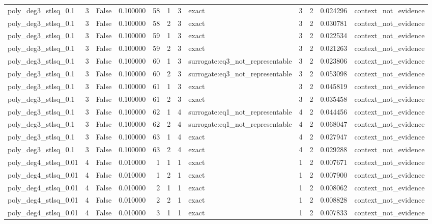 \begin{tabular}{lrrrrrrlrrrl}
poly\_deg3\_stlsq\_0.1 & 3 & False & 0.100000 & 58 & 1 & 3 & exact & 3 & 2 & 0.024296 & context\_not\_evidence \\
poly\_deg3\_stlsq\_0.1 & 3 & False & 0.100000 & 58 & 2 & 3 & exact & 3 & 2 & 0.030781 & context\_not\_evidence \\
poly\_deg3\_stlsq\_0.1 & 3 & False & 0.100000 & 59 & 1 & 3 & exact & 3 & 2 & 0.022534 & context\_not\_evidence \\
poly\_deg3\_stlsq\_0.1 & 3 & False & 0.100000 & 59 & 2 & 3 & exact & 3 & 2 & 0.021263 & context\_not\_evidence \\
poly\_deg3\_stlsq\_0.1 & 3 & False & 0.100000 & 60 & 1 & 3 & surrogate:eq3\_not\_representable & 3 & 2 & 0.023806 & context\_not\_evidence \\
poly\_deg3\_stlsq\_0.1 & 3 & False & 0.100000 & 60 & 2 & 3 & surrogate:eq3\_not\_representable & 3 & 2 & 0.053098 & context\_not\_evidence \\
poly\_deg3\_stlsq\_0.1 & 3 & False & 0.100000 & 61 & 1 & 3 & exact & 3 & 2 & 0.045819 & context\_not\_evidence \\
poly\_deg3\_stlsq\_0.1 & 3 & False & 0.100000 & 61 & 2 & 3 & exact & 3 & 2 & 0.035458 & context\_not\_evidence \\
poly\_deg3\_stlsq\_0.1 & 3 & False & 0.100000 & 62 & 1 & 4 & surrogate:eq1\_not\_representable & 4 & 2 & 0.044456 & context\_not\_evidence \\
poly\_deg3\_stlsq\_0.1 & 3 & False & 0.100000 & 62 & 2 & 4 & surrogate:eq1\_not\_representable & 4 & 2 & 0.068047 & context\_not\_evidence \\
poly\_deg3\_stlsq\_0.1 & 3 & False & 0.100000 & 63 & 1 & 4 & exact & 4 & 2 & 0.027947 & context\_not\_evidence \\
poly\_deg3\_stlsq\_0.1 & 3 & False & 0.100000 & 63 & 2 & 4 & exact & 4 & 2 & 0.029288 & context\_not\_evidence \\
poly\_deg4\_stlsq\_0.01 & 4 & False & 0.010000 & 1 & 1 & 1 & exact & 1 & 2 & 0.007671 & context\_not\_evidence \\
poly\_deg4\_stlsq\_0.01 & 4 & False & 0.010000 & 1 & 2 & 1 & exact & 1 & 2 & 0.007900 & context\_not\_evidence \\
poly\_deg4\_stlsq\_0.01 & 4 & False & 0.010000 & 2 & 1 & 1 & exact & 1 & 2 & 0.008062 & context\_not\_evidence \\
poly\_deg4\_stlsq\_0.01 & 4 & False & 0.010000 & 2 & 2 & 1 & exact & 1 & 2 & 0.008828 & context\_not\_evidence \\
poly\_deg4\_stlsq\_0.01 & 4 & False & 0.010000 & 3 & 1 & 1 & exact & 1 & 2 & 0.007833 & context\_not\_evidence \\

\end{tabular}
